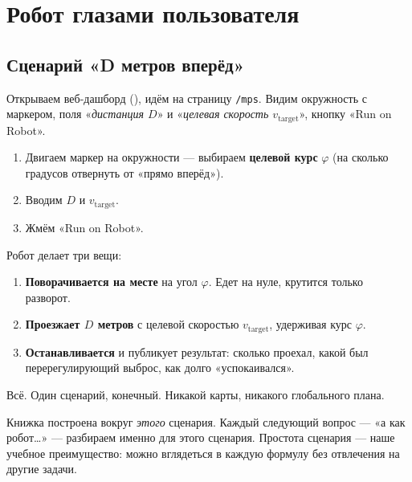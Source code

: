 \chapter{Робот глазами пользователя}
\label{ch:user_view}

\section{Сценарий «D метров вперёд»}

Открываем веб-дашборд (), идём на страницу
\texttt{/mps}. Видим окружность с маркером, поля «\textit{дистанция $D$}»
и «\textit{целевая скорость $v_\text{target}$}», кнопку «Run on Robot».

\begin{enumerate}
  \item Двигаем маркер на окружности --- выбираем \textbf{целевой курс}
        $\varphi$ (на сколько градусов отвернуть от «прямо вперёд»).
  \item Вводим $D$ и $v_\text{target}$.
  \item Жмём «Run on Robot».
\end{enumerate}

Робот делает три вещи:

\begin{enumerate}
  \item \textbf{Поворачивается на месте} на угол $\varphi$. Едет на нуле,
        крутится только разворот.
  \item \textbf{Проезжает $D$ метров} с целевой скоростью $v_\text{target}$,
        удерживая курс $\varphi$.
  \item \textbf{Останавливается} и публикует результат: сколько проехал,
        какой был перерегулирующий выброс, как долго «успокаивался».
\end{enumerate}

Всё. Один сценарий, конечный. Никакой карты, никакого глобального плана.

\begin{ideabox}
Книжка построена вокруг \emph{этого} сценария. Каждый следующий вопрос
--- «а как робот\dots» --- разбираем именно для этого сценария. Простота
сценария --- наше учебное преимущество: можно вглядеться в каждую формулу
без отвлечения на другие задачи.
\end{ideabox}

